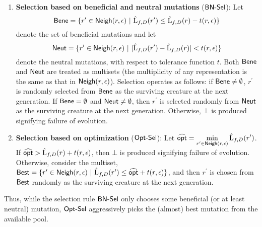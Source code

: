 \begin{enumerate}
\item {\bf Selection based on beneficial and neutral mutations} ($\mathsf{BN\mbox{-}Sel}$): Let 
%
\[ \mathsf{Bene} = \{r^\prime \in \mathsf{Neigh}(r, \epsilon) ~|~ \hat{\mathrm{L}}_{f, D}(r^\prime) \leq
\hat{\mathrm{L}}_{f, D}(r) - t(r, \epsilon) \} \]  
%
denote the set of beneficial mutations and let 
%
\[ \mathsf{Neut} = \{r^\prime \in \mathsf{Neigh}(r, \epsilon) ~|~ |\hat{\mathrm{L}}_{f, D}(r^\prime) -
\hat{\mathrm{L}}_{f, D}(r)| <  t(r, \epsilon) \} \]
%
denote the neutral mutations, with respect to tolerance function $t$. Both
$\mathsf{Bene}$ and $\mathsf{Neut}$ are treated as multisets (the multiplicity of any
representation is the same as that in $\mathsf{Neigh}(r, \epsilon)$). Selection
operates as follows: if $\mathsf{Bene} \neq \emptyset$, $r^\prime$ is randomly selected
from $\mathsf{Bene}$ as the surviving creature at the next generation.  If $\mathsf{Bene} =
\emptyset$ and $\mathsf{Neut} \neq\emptyset$, then $r^\prime$ is selected randomly from
$\mathsf{Neut}$ as the surviving creature at the next generation.  Otherwise, $\bot$ is
produced signifying failure of evolution.
%
\item {\bf Selection based on optimization} ($\mathsf{Opt\mbox{-}Sel}$): Let $\widehat{\mathsf{opt}} =
\displaystyle\min_{r^\prime \in \mathsf{Neigh}(r, \epsilon)} \hat{\mathrm{L}}_{f,
D}(r^\prime)$.  If $\widehat{\mathsf{opt}} > \hat{\mathrm{L}}_{f, D}(r) + t(r, \epsilon)$,
then $\bot$ is produced signifying failure of evolution.  Otherwise, consider
the multiset, $\mathsf{Best} = \{ r^\prime \in \mathsf{Neigh}(r, \epsilon) ~|~ \hat{\mathrm{L}}_{f,
D}(r^\prime) \leq \widehat{\mathsf{opt}} + t(r, \epsilon) \}$, and then $r^\prime$ is
chosen from $\mathsf{Best}$ randomly as the surviving creature at the next generation.
\end{enumerate}

\noindent Thus, while the selection rule $\mathsf{BN\mbox{-}Sel}$ only chooses some beneficial
(or at least neutral) mutation, $\mathsf{Opt\mbox{-}Sel}$ aggressively picks the (almost) best
mutation from the available pool. \medskip

